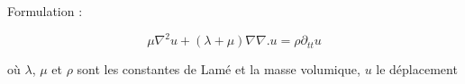 \documentclass[10pt,a4paper]{article}
\begin{document}
Formulation :

$$\mu \nabla^2 u + (\lambda+\mu)\nabla\nabla . u = \rho\partial_{tt} u $$

où $\lambda$, $\mu$ et $\rho$ sont les constantes de Lamé et la masse volumique, $u$ le déplacement
\end{document}
